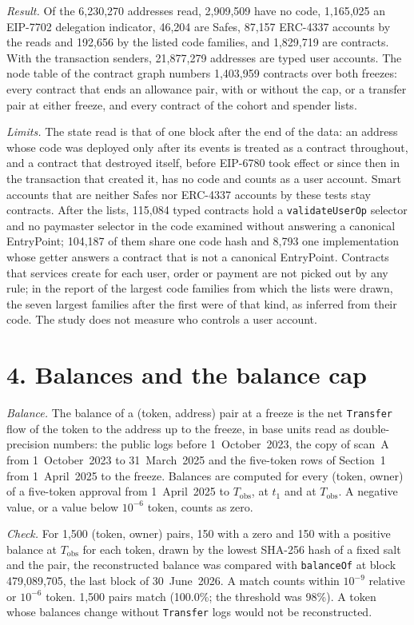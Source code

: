 \documentclass[10pt,letterpaper]{article}
\begin{document}
\textit{Result.} Of the 6,230,270 addresses read, 2,909,509 have no code, 1,165,025 an EIP-7702 delegation indicator, 46,204 are Safes, 87,157 ERC-4337 accounts by the reads and 192,656 by the listed code families, and 1,829,719 are contracts. With the transaction senders, 21,877,279 addresses are typed user accounts. The node table of the contract graph numbers 1,403,959 contracts over both freezes: every contract that ends an allowance pair, with or without the cap, or a transfer pair at either freeze, and every contract of the cohort and spender lists.

\textit{Limits.} The state read is that of one block after the end of the data: an address whose code was deployed only after its events is treated as a contract throughout, and a contract that destroyed itself, before EIP-6780 took effect or since then in the transaction that created it, has no code and counts as a user account. Smart accounts that are neither Safes nor ERC-4337 accounts by these tests stay contracts. After the lists, 115,084 typed contracts hold a \texttt{validateUserOp} selector and no paymaster selector in the code examined without answering a canonical EntryPoint; 104,187 of them share one code hash and 8,793 one implementation whose getter answers a contract that is not a canonical EntryPoint. Contracts that services create for each user, order or payment are not picked out by any rule; in the report of the largest code families from which the lists were drawn, the seven largest families after the first were of that kind, as inferred from their code. The study does not measure who controls a user account.

\section*{4. Balances and the balance cap}
\textit{Balance.} The balance of a (token, address) pair at a freeze is the net \texttt{Transfer} flow of the token to the address up to the freeze, in base units read as double-precision numbers: the public logs before 1~October~2023, the copy of scan~A from 1~October~2023 to 31~March~2025 and the five-token rows of Section~1 from 1~April~2025 to the freeze. Balances are computed for every (token, owner) of a five-token approval from 1~April~2025 to $T_{\mathrm{obs}}$, at $t_1$ and at $T_{\mathrm{obs}}$. A negative value, or a value below $10^{-6}$ token, counts as zero.

\textit{Check.} For 1,500 (token, owner) pairs, 150 with a zero and 150 with a positive balance at $T_{\mathrm{obs}}$ for each token, drawn by the lowest SHA-256 hash of a fixed salt and the pair, the reconstructed balance was compared with \texttt{balanceOf} at block 479,089,705, the last block of 30~June~2026. A match counts within $10^{-9}$ relative or $10^{-6}$ token. 1,500 pairs match (100.0\%; the threshold was 98\%). A token whose balances change without \texttt{Transfer} logs would not be reconstructed.
\end{document}
